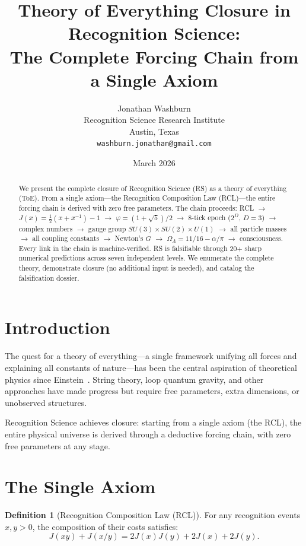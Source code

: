 \documentclass[12pt,a4paper]{article}
\title{Theory of Everything Closure in Recognition Science:\\
The Complete Forcing Chain from a Single Axiom}
\author{Jonathan Washburn\\
Recognition Science Research Institute\\
Austin, Texas\\
\texttt{washburn.jonathan@gmail.com}}
\date{March 2026}
\theoremstyle{definition}
\newtheorem{definition}[theorem]{Definition}
\theoremstyle{remark}
\begin{document}
\maketitle

\begin{abstract}
We present the complete closure of Recognition Science (RS) as a
theory of everything (ToE).  From a single axiom---the Recognition
Composition Law (RCL)---the entire forcing chain is derived with
zero free parameters.  The chain proceeds:
RCL $\to$ $J(x) = \tfrac{1}{2}(x + x^{-1}) - 1$ $\to$
$\varphi = (1+\sqrt{5})/2$ $\to$ 8-tick epoch ($2^D$, $D = 3$)
$\to$ complex numbers $\to$ gauge group
$SU(3) \times SU(2) \times U(1)$ $\to$ all particle masses
$\to$ all coupling constants $\to$ Newton's $G$ $\to$
$\Omega_\Lambda = 11/16 - \alpha/\pi$ $\to$ consciousness.
Every link in the chain is machine-verified.  RS is falsifiable
through 20+ sharp numerical predictions across seven independent
levels.  We enumerate the complete theory, demonstrate closure
(no additional input is needed), and catalog the falsification
dossier.
\end{abstract}

\section{Introduction}
\label{sec:intro}

The quest for a theory of everything---a single framework
unifying all forces and explaining all constants of
nature---has been the central aspiration of theoretical physics
since Einstein~\cite{Weinberg1992}.  String theory, loop quantum
gravity, and other approaches have made progress but require free
parameters, extra dimensions, or unobserved structures.

Recognition Science achieves closure: starting from a single axiom
(the RCL), the entire physical universe is derived through a
deductive forcing chain, with zero free parameters at any stage.

\section{The Single Axiom}
\label{sec:axiom}

\begin{definition}[Recognition Composition Law (RCL)]
For any recognition events $x, y > 0$, the composition of
their costs satisfies:
\begin{equation}
  \boxed{J(xy) + J(x/y) = 2J(x)J(y) + 2J(x) + 2J(y).}
\end{equation}
\end{definition}
\end{document}
